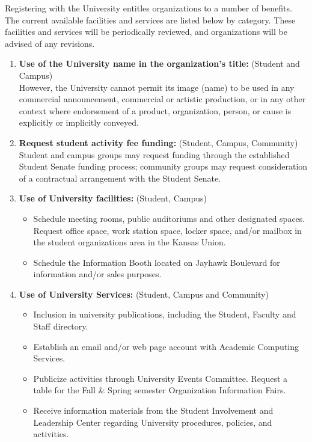 Registering with the University entitles organizations to a number of benefits. The current available facilities and services are listed below by category. These facilities and services will be periodically reviewed, and organizations will be advised of any revisions.
\begin{enumerate}
	\item \textbf{Use of the University name in the organization's title:} (Student and Campus) \\
However, the University cannot permit its image (name) to be used in any commercial announcement, commercial or artistic production, or in any other context where endorsement of a product, organization, person, or cause is explicitly or implicitly conveyed.
	\item \textbf{Request student activity fee funding:} (Student, Campus, Community) \\
Student and campus groups may request funding through the established Student Senate funding process; community groups may request consideration of a contractual arrangement with the Student Senate.
	\item \textbf{Use of University facilities:} (Student, Campus)
	\begin{itemize}
		\item Schedule meeting rooms, public auditoriums and other designated spaces. Request office space, work station space, locker space, and/or mailbox in the student organizations area in the Kansas Union.
		\item Schedule the Information Booth located on Jayhawk Boulevard for information and/or sales purposes.
	\end{itemize}
	\item \textbf{Use of University Services:} (Student, Campus and Community)
	\begin{itemize}
		\item Inclusion in university publications, including the Student, Faculty and Staff directory.
		\item Establish an email and/or web page account with Academic Computing Services.
		\item Publicize activities through University Events Committee. Request a table for the Fall \& Spring semester Organization Information Fairs.
		\item Receive information materials from the Student Involvement and Leadership Center regarding University procedures, policies, and activities.
	\end{itemize}

\end{enumerate}
